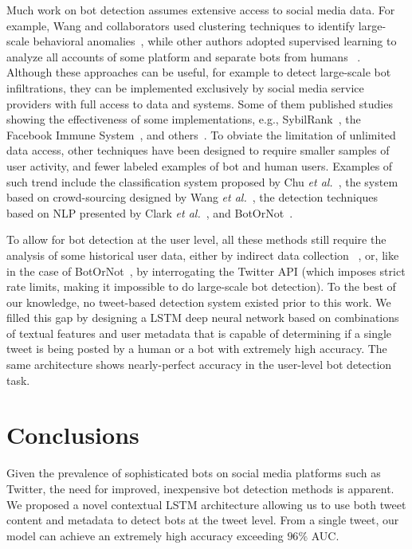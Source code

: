 Much work on bot detection assumes extensive access to social media data. For example, Wang and collaborators used clustering techniques to identify large-scale behavioral anomalies~\cite{wang2013you}, while other authors adopted supervised learning to analyze all accounts of some platform and separate bots from humans ~\cite{lee2011seven,beutel2013copycatch,elyashar2013homing,yang2014uncovering}. Although these approaches can be useful, for example to detect large-scale bot infiltrations, they can be implemented exclusively by social media service providers with full access to data and systems. Some of them  published studies showing the effectiveness of some implementations, e.g., SybilRank~\cite{cao2012aiding}, the Facebook Immune System~\cite{stein2011facebook}, and others~\cite{alvisi2013sok}.  
To obviate the limitation of unlimited data access, other techniques have been designed to require smaller samples of user activity, and fewer labeled examples of bot and human users. Examples of such trend include the classification system proposed by Chu \textit{et al.}~\cite{chu2010tweeting,chu2012detecting}, the system based on crowd-sourcing designed by Wang \textit{et al.}~\cite{wang2012social}, the detection techniques based on NLP presented by 
Clark \textit{et al.}~\cite{clark2016sifting}, and BotOrNot~\cite{davis2016botornot}. 

To allow for bot detection at the user level, all these methods still require the analysis of some historical user data, either by indirect data collection ~\cite{chu2010tweeting,chu2012detecting,wang2012social,clark2016sifting}, or, like in the case of BotOrNot~\cite{davis2016botornot}, by interrogating the Twitter API (which imposes strict rate limits, making it impossible to do large-scale bot detection). To the best of our knowledge, no tweet-based detection system existed prior to this work. We filled this gap by designing a LSTM deep neural network based on combinations of textual features and user metadata that is capable of determining if a single tweet is being posted by a human or a bot with extremely high accuracy. The same architecture shows nearly-perfect accuracy in the user-level bot detection task.

\section{Conclusions}



Given the prevalence of sophisticated bots on social media platforms such as Twitter, the need for improved, inexpensive bot detection methods is apparent. We proposed a novel contextual LSTM architecture allowing us to use both tweet content and metadata to detect bots at the tweet level. From a single tweet, our model can achieve an extremely high accuracy exceeding $96\%$ AUC. 

